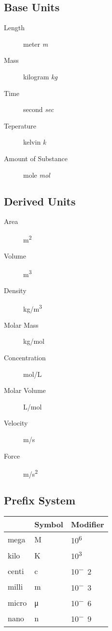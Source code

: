 \subsection{Base Units}
\begin{description}
  \item[Length] meter \textit{m}
  \item[Mass] kilogram \textit{kg}
  \item[Time] second \textit{sec}
  \item[Teperature] kelvin \textit{k}
  \item[Amount of Substance] mole \textit{mol}
\end{description}

\subsection{Derived Units}
\begin{description}
  \item[Area] \si{m^2}
  \item[Volume] \si{m^3}
  \item[Density] \si{kg/m^3}
  \item[Molar Mass] \si{kg/mol}
  \item[Concentration] \si{mol/L}
  \item[Molar Volume] \si{L/mol}
  \item[Velocity] \si{m/s}
  \item[Force] \si{m/s^2}
\end{description}

\subsection{Prefix System}
\begin{table}[h]
\begin{tabular}{@{}lll@{}}
\toprule
        & Symbol  & Modifier \\ \midrule
  mega  & M       & \si{10^6} \\
  kilo  & K       & \si{10^3} \\
  centi & c       & \si{10^-2} \\
  milli & m       & \si{10^-3} \\
  micro & μ       & \si{10^-6} \\
  nano  & n       & \si{10^-9} \\ \bottomrule
\end{tabular}
\end{table}

